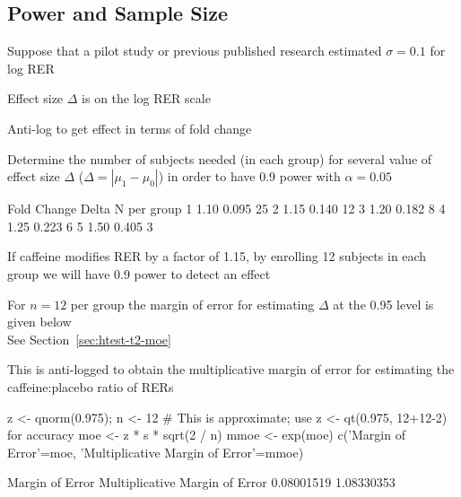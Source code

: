 \subsection{Power and Sample Size}

\bi
\item Suppose that a pilot study or previous published research
  estimated $\sigma = 0.1$ for log RER
\item Effect size $\Delta$ is on the log RER scale
\item Anti-log to get effect in terms of fold change
\item Determine the number of subjects needed (in each group) for several value of effect size $\Delta$ ($\Delta = |\mu_1 - \mu_0|$) in order to have 0.9 power with $\alpha = 0.05$
\ei
\begin{Schunk}
\begin{Soutput}
  Fold Change Delta N per group
1        1.10 0.095          25
2        1.15 0.140          12
3        1.20 0.182           8
4        1.25 0.223           6
5        1.50 0.405           3
\end{Soutput}
\end{Schunk}
\bi
\item If caffeine modifies RER by a factor of 1.15, by enrolling 12 subjects in each group we will have 0.9 power to detect an effect
\item For $n=12$ per group the margin of error for estimating $\Delta$ at the 0.95 level is given below\\
  See Section~\ref{sec:htest-t2-moe}
\item This is anti-logged to obtain the multiplicative margin of error for estimating the caffeine:placebo ratio of RERs
\ei

\begin{Schunk}
\begin{Sinput}
z <- qnorm(0.975); n <- 12
# This is approximate; use z <- qt(0.975, 12+12-2) for accuracy
moe <- z * s * sqrt(2 / n)
mmoe <- exp(moe)
c('Margin of Error'=moe, 'Multiplicative Margin of Error'=mmoe)
\end{Sinput}
\begin{Soutput}
               Margin of Error Multiplicative Margin of Error 
                    0.08001519                     1.08330353 
\end{Soutput}
\end{Schunk}

